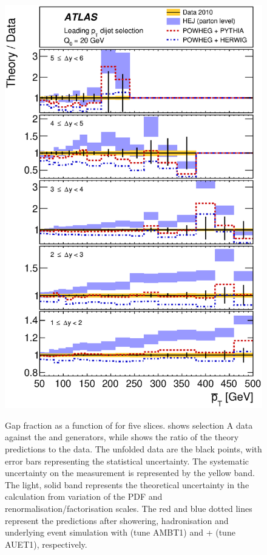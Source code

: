 \begin{figure}[htpb]
{    \includegraphics[width=\smallfigwidth]{chapters/gbj/GapFraction_PtBarDist_gap_Q0_sel_A_Ratio.eps}
    \label{fig:gbj:Gap_fraction_pTbar_A_ratio}}
  \caption{Gap fraction as a function of \pTbar for five \DeltaY slices. \protect{}
           shows selection A data against the \HEJ and \Powheg generators, while \protect{}
           shows the ratio of the theory predictions to the data. The unfolded data
           are the black points, with error bars representing the statistical uncertainty.
           The systematic uncertainty on the measurement is represented by the yellow band. 
           The light, solid band represents the theoretical uncertainty in the \HEJ calculation
           from variation of the PDF and renormalisation/factorisation scales. The red
           and blue dotted lines represent the \Powheg predictions after showering, hadronisation
           and underlying event simulation with \Pythia (tune AMBT1) and \Herwig+\Jimmy
           (tune AUET1), respectively.}
  \label{fig:gbj:Gap_fraction_pTbar_A}
\end{figure}

